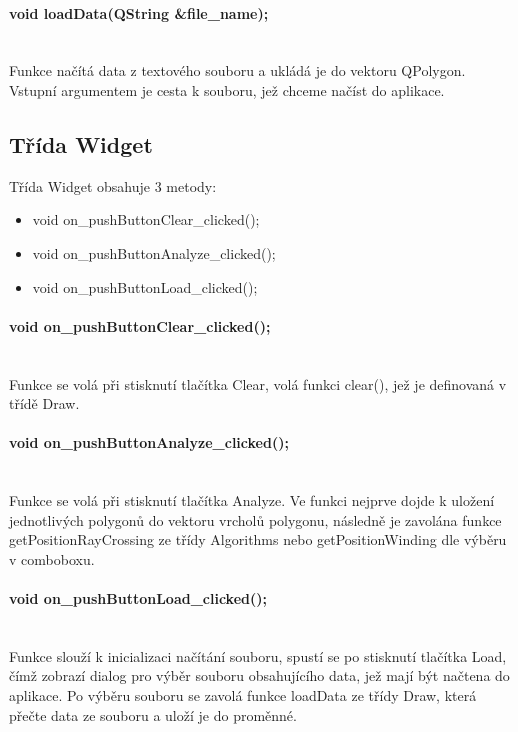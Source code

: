 \documentclass[11pt]{article}
\begin{document}
\paragraph{void loadData(QString \&file\_name);}\mbox{}\\
Funkce načítá data z textového souboru a ukládá je do vektoru QPolygon. Vstupní argumentem je cesta k souboru, jež chceme načíst do aplikace.   

\subsection{Třída Widget}
Třída Widget obsahuje 3 metody:

\begin{itemize}
\item void on\_pushButtonClear\_clicked();
\item void on\_pushButtonAnalyze\_clicked();
\item void on\_pushButtonLoad\_clicked();
\end{itemize}

\paragraph{ void on\_pushButtonClear\_clicked();}\mbox{}\\
Funkce se volá při stisknutí tlačítka Clear, volá funkci clear(), jež je definovaná v třídě Draw.

\paragraph{ void on\_pushButtonAnalyze\_clicked();}\mbox{}\\
Funkce se volá při stisknutí tlačítka Analyze. Ve funkci nejprve dojde k uložení jednotlivých polygonů do vektoru vrcholů polygonu, následně je zavolána funkce getPositionRayCrossing ze třídy Algorithms nebo getPositionWinding dle výběru v comboboxu.

\paragraph{void on\_pushButtonLoad\_clicked();}\mbox{}\\
Funkce slouží k inicializaci načítání souboru, spustí se po stisknutí tlačítka Load, čímž zobrazí dialog pro výběr souboru obsahujícího data, jež mají být načtena do aplikace. Po výběru souboru se zavolá funkce loadData ze třídy Draw, která přečte data ze souboru a uloží je do proměnné.
\end{document}
